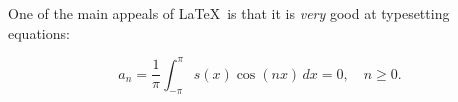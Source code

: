 \documentclass[12pt,letterpaper]{article}
\begin{document}
One of the main appeals of \LaTeX\ is that it is \textit{very} good at
typesetting equations:

\[
a_n = \frac{1}{\pi}\int_{-\pi}^{\pi}s(x) \cos(nx)\,dx = 0, \quad n \ge
0.
\]
\end{document}
